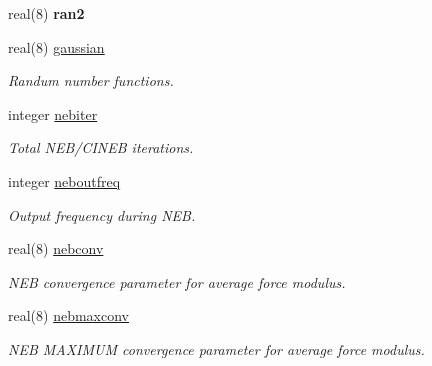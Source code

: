 \begin{DoxyCompactItemize}
real(8) {\bfseries ran2}
\item 
\mbox{\label{namespaceglobaldata_ad68f5ecea7008de2e8a7cd481573198c}} 
real(8) \mbox{\hyperlink{namespaceglobaldata_ad68f5ecea7008de2e8a7cd481573198c}{gaussian}}
\begin{DoxyCompactList}\small\item\em Randum number functions. \end{DoxyCompactList}\item 
\mbox{\label{namespaceglobaldata_a4d2fe09af3d5679f445f695d697182e4}} 
integer \mbox{\hyperlink{namespaceglobaldata_a4d2fe09af3d5679f445f695d697182e4}{nebiter}}
\begin{DoxyCompactList}\small\item\em Total N\+E\+B/\+C\+I\+N\+EB iterations. \end{DoxyCompactList}\item 
\mbox{\label{namespaceglobaldata_ad96ca55abacc224463f4b40dcbd0413e}} 
integer \mbox{\hyperlink{namespaceglobaldata_ad96ca55abacc224463f4b40dcbd0413e}{neboutfreq}}
\begin{DoxyCompactList}\small\item\em Output frequency during N\+EB. \end{DoxyCompactList}\item 
\mbox{\label{namespaceglobaldata_abfa7f4203a3e171cdc7c408808b5c9e5}} 
real(8) \mbox{\hyperlink{namespaceglobaldata_abfa7f4203a3e171cdc7c408808b5c9e5}{nebconv}}
\begin{DoxyCompactList}\small\item\em N\+EB convergence parameter for average force modulus. \end{DoxyCompactList}\item 
\mbox{\label{namespaceglobaldata_ab5ef5feda2d83408b0a4e28f5305e1fc}} 
real(8) \mbox{\hyperlink{namespaceglobaldata_ab5ef5feda2d83408b0a4e28f5305e1fc}{nebmaxconv}}
\begin{DoxyCompactList}\small\item\em N\+EB M\+A\+X\+I\+M\+UM convergence parameter for average force modulus. \end{DoxyCompactList}\item 
\mbox{\label{namespaceglobaldata_a14c5976d38377f9a7cbef0e55faffa8a}} 

\end{DoxyCompactItemize}
